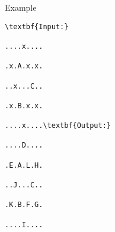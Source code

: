 Example
\begin{verbatim}
\textbf{Input:}

....x....

.x.A.x.x.

..x...C..

.x.B.x.x.

....x....\textbf{Output:}

....D....

.E.A.L.H.

..J...C..

.K.B.F.G.

....I....\end{verbatim}